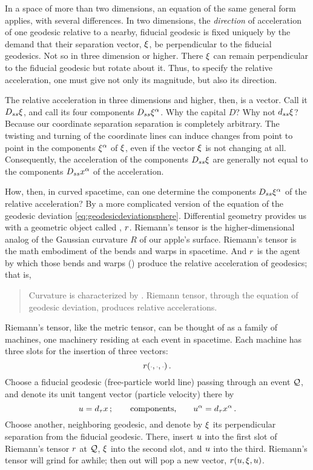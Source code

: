 In a space of more than two dimensions, an equation of the same general form applies, with several differences. In two dimensions, the \emph{direction} of acceleration of one geodesic relative to a nearby, fiducial geodesic is fixed uniquely by the demand that their separation vector, $\xi$, be perpendicular to the fiducial geodesics. Not so in three dimension or higher. There $\xi$ can remain perpendicular to the fiducial geodesic but rotate about it. Thus, to specify the relative acceleration, one must give not only its magnitude, but also its direction.

The relative acceleration in three dimensions and higher, then, is a vector. Call it $D_{ss}\xi$, and call its four components $D_{ss}\tvec\svec\alpha$. Why the capital $D$? Why not $d_{ss}\xi$? Because our coordinate separation separation is completely arbitrary. The twisting and turning of the coordinate lines can induce changes from point to point in the components $\tvec\svec\alpha$ of $\xi$, even if the vector $\xi$ is not changing at all. Consequently, the acceleration of the components $D_{ss}\xi$ are generally not equal to the components $D_{ss}\tvec\pos\alpha$ of the acceleration.

How, then, in curved spacetime, can one determine the components $D_{ss}\tvec\svec\alpha$ of the relative acceleration? By a more complicated version of the equation of the geodesic deviation \cref{eq:geodesicdeviationsphere}. Differential geometry provides us with a geometric object called , $r$. Riemann's tensor is the higher-dimensional analog of the Gaussian curvature $R$ of our apple's surface. Riemann's tensor is the math embodiment of the bends and warps in spacetime. And $r$ is the agent by which those bends and warps () produce the relative acceleration of geodesics; that is,
%
\begin{quotation}
  Curvature is characterized by . Riemann tensor, through the equation of geodesic deviation, produces relative accelerations.
\end{quotation}
%
Riemann's tensor, like the metric tensor, can be thought of as a family of machines, one machinery residing at each event in spacetime. Each machine has three slots for the insertion of three vectors:
%
\begin{equation*}
  \riemann\vat{\eslot,\eslot,\eslot}\,.
\end{equation*}
%
Choose a fiducial geodesic (free-particle world line) passing through an event $\event Q$, and denote its unit tangent vector (particle velocity) there by
%
\begin{equation*}
  \vel = d_\ptime\pos\,;\qquad\text{components,}\qquad \tvec\vel\alpha = d_\ptime\tvec\pos\alpha\,.
\end{equation*}
%
Choose another, neighboring geodesic, and denote by $\xi$ its perpendicular separation from the fiducial geodesic. There, insert $u$ into the first slot of Riemann's tensor $r$ at $\event Q$, $\xi$ into the second slot, and $u$ into the third. Riemann's tensor will grind for awhile; then out will pop a new vector, $\riemann\vat{\vel,\svec,\vel}$.

